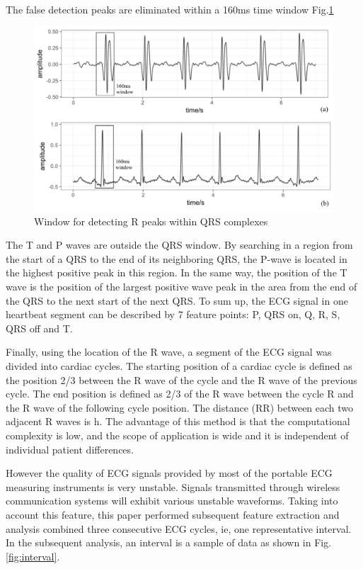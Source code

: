 The false detection peaks are eliminated within a 160ms time window Fig.\ref{fig:window}


\begin{figure}[t]
\centering
\includegraphics[scale=.5]{Fig/window.pdf}
\caption{Window for detecting R peaks within QRS complexes}
\label{fig:window}
\end{figure}


The T and P waves are outside the QRS window. By searching in a region from the start of a QRS to the end of its neighboring QRS, the P-wave is located in the highest positive peak in this region. In the same way, the position of the T wave is the position of the largest positive wave peak in the area from the end of the QRS to the next start of the next QRS. To sum up, the ECG signal in one heartbeat segment can be described by 7 feature points: P, QRS on, Q, R, S, QRS off and T. 

Finally, using the location of the R wave, a segment of the ECG signal was divided into cardiac cycles. The starting position of a cardiac cycle is defined as the position 2/3 between the R wave of the cycle and the R wave of the previous cycle. The end position is defined as 2/3 of the R wave between the cycle R and the R wave of the following cycle position. The distance (RR) between each two adjacent R waves is h. The advantage of this method is that the computational complexity is low, and the scope of application is wide and it is independent of individual patient differences. 

However the quality of ECG signals provided by most of the portable ECG measuring instruments is very unstable. Signals transmitted through wireless communication systems will exhibit various unstable waveforms. Taking into account this feature, this paper performed subsequent feature extraction and analysis combined three consecutive ECG cycles, ie, one representative interval. In the subsequent analysis, an interval is a sample of data as shown in Fig.\ref{fig:interval}.

